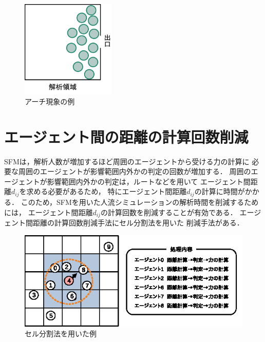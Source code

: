 \begin{figure}[hbtp]
 \begin{center}
  \includegraphics[width=4.5cm,clip]{figure/atigenshou.eps}
  \caption{アーチ現象の例}
  \label{fig:atigenshou}
 \end{center}
\end{figure}

\section{エージェント間の距離の計算回数削減}
SFMは，解析人数が増加するほど周囲のエージェントから受ける力の計算に
必要な周囲のエージェントが影響範囲内外かの判定の回数が増加する．
周囲のエージェントが影響範囲内外かの判定は，ルートなどを用いて
エージェント間距離$d_{ij}$を求める必要があるため，
特にエージェント間距離$d_{ij}$の計算に時間がかかる．
このため，SFMを用いた人流シミュレーションの解析時間を削減するためには，
エージェント間距離$d_{ij}$の計算回数を削減することが有効である．
エージェント間距離の計算回数削減手法にセル分割法を用いた
削減手法がある．

\begin{figure}[t]
 \begin{center}
  \includegraphics[width=11.5cm,clip]{figure/serubunkatu_ex1.eps}
  \caption{セル分割法を用いた例}
  \label{fig:seru_ex1}
 \end{center}
\end{figure}


